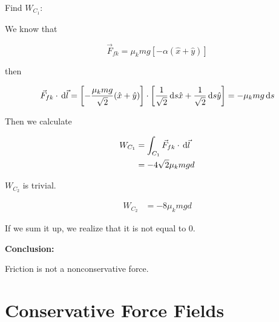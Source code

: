 \begin{sol}
	Find $W_{C_1}$:

	We know that

	\begin{equation}
		\vec F_{fk} = \mu_k mg \left[-\alpha (\hat x + \hat y)\right]
	\end{equation}

	then

	\begin{equation}
		\vec F_{fk} \cdot \D \vec l = \left[-\frac{\mu_k mg}{\sqrt{2}} (\hat x + \hat y)\right] \cdot \left[\frac{1}{\sqrt{2}} \D s \hat x + \frac{1}{\sqrt{2}} \D s \hat y\right] = -\mu_k mg \D s
	\end{equation}

	Then we calculate

	\begin{align}
		W_{C_1} &= \int_{C_1} \vec F_{fk} \cdot \D \vec l\\
		&= -4\sqrt{2}\mu_k mgd
	\end{align}

	$W_{C_2}$ is trivial.

	\begin{align}
		W_{C_2} &= -8 \mu_k mgd
	\end{align}

	If we sum it up, we realize that it is not equal to 0.

	\textbf{Conclusion:}

	Friction is not a nonconservative force.
\end{sol}

\section{Conservative Force Fields}

